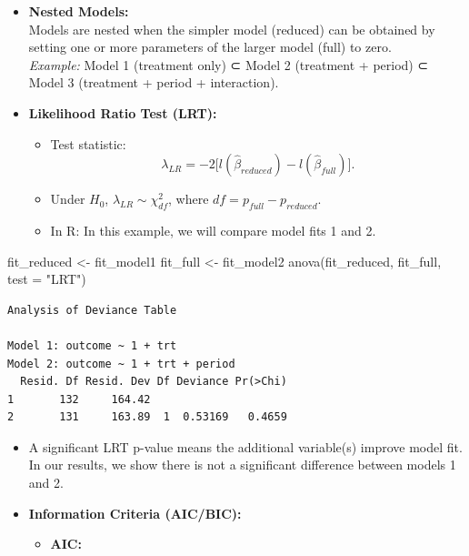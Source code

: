 \documentclass[
  letterpaper,
  DIV=11,
  numbers=noendperiod]{scrreprt}
\newenvironment{Shaded}{\begin{snugshade}}{\end{snugshade}}
\newcommand{\AttributeTok}[1]{\textcolor[rgb]{0.40,0.45,0.13}{#1}}
\newcommand{\FunctionTok}[1]{\textcolor[rgb]{0.28,0.35,0.67}{#1}}
\newcommand{\NormalTok}[1]{\textcolor[rgb]{0.00,0.23,0.31}{#1}}
\newcommand{\OtherTok}[1]{\textcolor[rgb]{0.00,0.23,0.31}{#1}}
\newcommand{\StringTok}[1]{\textcolor[rgb]{0.13,0.47,0.30}{#1}}
\providecommand{\tightlist}{%
  \setlength{\itemsep}{0pt}\setlength{\parskip}{0pt}}\usepackage{longtable,booktabs,array}
\begin{document}
\begin{itemize}
\item
  \textbf{Nested Models:}\\
  Models are nested when the simpler model (reduced) can be obtained by
  setting one or more parameters of the larger model (full) to zero.\\
  \emph{Example:} Model 1 (treatment only) ⊂ Model 2 (treatment +
  period) ⊂ Model 3 (treatment + period + interaction).
\item
  \textbf{Likelihood Ratio Test (LRT):}

  \begin{itemize}
  \tightlist
  \item
    Test statistic:\\
    \[
    \lambda_{LR} = -2 \big[ l(\hat{\beta}_{reduced}) - l(\hat{\beta}_{full}) \big].
    \]
  \item
    Under \(H_0\), \(\lambda_{LR} \sim \chi^2_{df}\), where
    \(df = p_{full} - p_{reduced}\).\\
  \item
    In R: In this example, we will compare model fits 1 and 2.
  \end{itemize}
\end{itemize}

\begin{Shaded}
\begin{Highlighting}[]
\NormalTok{fit\_reduced }\OtherTok{\textless{}{-}}\NormalTok{ fit\_model1}
\NormalTok{fit\_full }\OtherTok{\textless{}{-}}\NormalTok{ fit\_model2}
\FunctionTok{anova}\NormalTok{(fit\_reduced, fit\_full, }\AttributeTok{test =} \StringTok{"LRT"}\NormalTok{)}
\end{Highlighting}
\end{Shaded}

\begin{verbatim}
Analysis of Deviance Table

Model 1: outcome ~ 1 + trt
Model 2: outcome ~ 1 + trt + period
  Resid. Df Resid. Dev Df Deviance Pr(>Chi)
1       132     164.42                     
2       131     163.89  1  0.53169   0.4659
\end{verbatim}

\begin{itemize}
\item
  A significant LRT p-value means the additional variable(s) improve
  model fit. In our results, we show there is not a significant
  difference between models 1 and 2.
\item
  \textbf{Information Criteria (AIC/BIC):}

  \begin{itemize}
  \tightlist
  \item
    \textbf{AIC:}
  \end{itemize}
\end{itemize}
\end{document}
